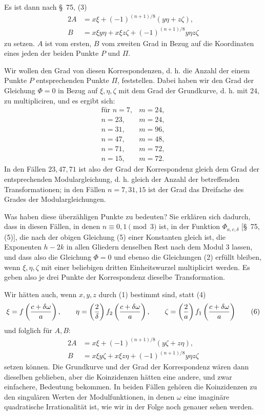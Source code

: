 \documentclass[11pt]{article}
\begin{document}
Es ist dann nach \S~75, (3)
\begin{equation}
\begin{aligned}
2A&=x\xi+(-1)^{(n+1)/8}(y\eta+z\zeta),\\
B&=x\xi y\eta+x\xi z\zeta+(-1)^{(n+1)/8}y\eta z\zeta
\end{aligned}
\tag{5}
\end{equation}
zu setzen. $A$ ist vom ersten, $B$ vom zweiten Grad in Bezug auf die Koordinaten eines jeden der beiden Punkte $P$ und $\Pi$.

Wir wollen den Grad von diesen Korrespondenzen, d. h. die Anzahl der einem Punkte $P$ entsprechenden Punkte $\Pi$, feststellen. Dabei haben wir den Grad der Gleichung $\Phi=0$ in Bezug auf $\xi,\eta,\zeta$ mit dem Grad der Grundkurve, d. h. mit $24$, zu multipliciren, und es ergibt sich:
\[
\begin{array}{c|c}
\text{für } n=7,&m=24,\\
 n=23,&m=24,\\
 n=31,&m=96,\\
 n=47,&m=48,\\
 n=71,&m=72,\\
 n=15,&m=72.
\end{array}
\]
In den Fällen $23,47,71$ ist also der Grad der Korrespondenz gleich dem Grad der entsprechenden Modulargleichung, d. h. gleich der Anzahl der betreffenden Transformationen; in den Fällen $n=7,31,15$ ist der Grad das Dreifache des Grades der Modulargleichungen.

Was haben diese überzähligen Punkte zu bedeuten? Sie erklären sich dadurch, dass in diesen Fällen, in denen $n\equiv0,1\pmod 3$ ist, in der Funktion $\Phi_{a,c,\delta}$ [\S~75, (5)], die nach der obigen Gleichung (5) einer Konstanten gleich ist, die Exponenten $h-2k$ in allen Gliedern denselben Rest nach dem Modul $3$ lassen, und dass also die Gleichung $\Phi=0$ und ebenso die Gleichungen (2) erfüllt bleiben, wenn $\xi,\eta,\zeta$ mit einer beliebigen dritten Einheitswurzel multiplicirt werden. Es geben also je drei Punkte der Korrespondenz dieselbe Transformation.

Wir hätten auch, wenn $x,y,z$ durch (1) bestimmt sind, statt (4)
\begin{equation}
\xi=f\left({c+\delta\omega\over a}\right),\qquad
\eta=\left({2\over\delta}\right)f_2\left({c+\delta\omega\over a}\right),\qquad
\zeta=\left({2\over a}\right)f_1\left({c+\delta\omega\over a}\right)
\tag{6}
\end{equation}
und folglich für $A,B$:
\begin{equation}
\begin{aligned}
2A&=x\xi+(-1)^{(n+1)/8}(y\zeta+z\eta),\\
B&=x\xi y\zeta+x\xi z\eta+(-1)^{(n+1)/8}y\eta z\zeta
\end{aligned}
\tag{7}
\end{equation}
setzen können. Die Grundkurve und der Grad der Korrespondenz wären dann dieselben geblieben, aber die Koinzidenzen hätten eine andere, und zwar einfachere, Bedeutung bekommen. In beiden Fällen gehören die Koinzidenzen zu den singulären Werten der Modulfunktionen, in denen $\omega$ eine imaginäre quadratische Irrationalität ist, wie wir in der Folge noch genauer sehen werden.
\end{document}
